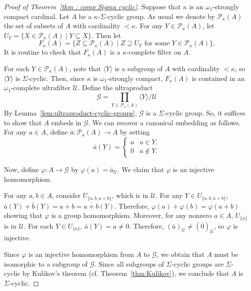 \documentclass[a4paper]{amsart}
\theoremstyle{definition}
\theoremstyle{remark}
\numberwithin{equation}{section}
\begin{document}
\begin{proof}[Proof of Theorem~\ref{thm : comp Sigma cyclic}]
Suppose that \(\kappa\) is an \(\omega_1\)-strongly compact cardinal. Let \(A\) be a \(\kappa\)-\(\Sigma\)-cyclic group. As usual we denote by \(\mathcal{P}_\kappa(A)\) the set of subsets of \(A\) with cardinality \({<}\kappa\).
For any $Y \in \mathcal{P}_\kappa(A)$, let $U_Y = \{X \in \mathcal{P}_\kappa(A) \mid Y \subseteq X\}$. Then let
\[F_{\kappa}(A) = \{Z \subseteq \mathcal{P}_\kappa(A) \mid Z \supseteq U_Y \text{ for some } Y \in \mathcal{P}_{\kappa}(A) \}.\]
It is routine to check that $F_{\kappa}(A)$ is a $\kappa$-complete filter on $A$.
    
    For each $Y \in \mathcal{P}_\kappa(A)$, note that $\langle Y \rangle$ is a subgroup of $A$ with cardinality $<\kappa$, so $\langle Y \rangle$ is $\Sigma$-cyclic. Then, since $\kappa$ is $\omega_1$-strongly compact, $F_{\kappa}(A)$ is contained in an $\omega_1$-complete ultrafilter $\mathcal{U}$. Define the ultraproduct
    \[
    \mathcal{G} = \prod_{Y \in \mathcal{P}_\kappa(A)} \langle Y \rangle / \mathcal{U}
    \]
    By Lemma~\ref{lem:ultraproduct-cyclic-groups}, $\mathcal{G}$ is a $\Sigma$-cyclic group. So, it suffices to show that \(A\) embeds in \(\mathcal{G}\). We can recover a canonical embedding as follows. For any $a \in A$, define $\bar{a} \colon \mathcal{P}_\kappa(A) \to A$ by setting
    \[ \bar{a}(Y) = 
    \begin{cases}
        a & a \in Y. \\
        0 & a \notin Y.
    \end{cases}
    \]

Now, define $\varphi \colon A \to \mathcal{G}$ by $\varphi(a) = \bar{a}_\mathcal{U}$. We claim that $\varphi$ is an injective homomorphism.

For any $a,b \in A$, consider $U_{\{a,b,a+b\}}$, which is in $\mathcal{U}$. For any $Y \in U_{\{a,b,a+b\}}$, $\bar{a}(Y) + \bar{b}(Y)= a+b = \overline{a+b}(Y)$. Therefore, $\varphi(a)+\varphi(b) = \varphi(a+b)$ showing that \(\varphi\) is a group homomorphism. Moreover, for any nonzero $a \in A$, $U_{\{a\}}$ is in $\mathcal{U}$. For each $Y \in U_{\{a\}}$, $\bar{a}(Y) = a \neq 0$. Therefore, $(\bar{a})_{\mathcal{U}} \neq (\bar{0})_{\mathcal{U}}$, so $\varphi$ is injective.

Since $\varphi$ is an injective homomorphism from $A$ to $\mathcal{G}$, we obtain that $A$ must be isomorphic to a subgroup of $\mathcal{G}$. Since all subgroups of $\Sigma$-cyclic groups are $\Sigma$-cyclic by Kulikov's theorem (cf. Theorem~\ref{thm:Kulikov}), we conclude that $A$ is $\Sigma$-cyclic.
\end{proof}
\end{document}
